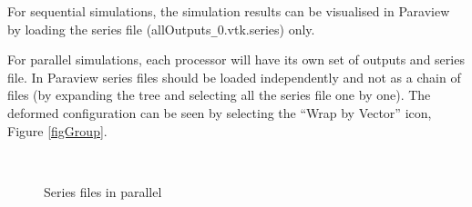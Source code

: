 \documentclass[oneside,11pt,times]{book}
\begin{document}
For sequential simulations, the simulation results can be visualised in Paraview by loading the series file (allOutputs\texttt{\_}0.vtk.series) only.

For parallel simulations, each processor will have its own set of outputs and series file. In Paraview series files should be loaded independently and not as a chain of files (by expanding the tree and selecting all the series file one by one). The deformed configuration can be seen by selecting the ``Wrap by Vector'' icon, Figure \ref{figGroup}.

\begin{figure}[h!]
    \begin{center}
        \mbox{
            \quad
             }
        \caption{Series files in parallel}
        \label{figcollector}
    \end{center}
\end{figure}
\end{document}
